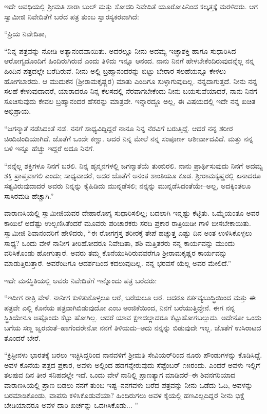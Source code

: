 ಇದೇ ಅವಧಿಯಲ್ಲಿ ಶ್ರೀಮತಿ ಸಾರಾ ಬುಲ್ ಮತ್ತು ಸೋದರಿ ನಿವೇದಿತೆ ಯೂರೋಪಿನಿಂದ ಕಲ್ಕತ್ತಕ್ಕೆ ಮರಳಿದರು. ಆಗ ಸ್ವಾಮೀಜಿ ನಿವೇದಿತೆಗೆ ಬರೆದ ಪತ್ರ ತುಂಬ ಸ್ವಾರಸ್ಯಕರವಾಗಿದೆ:

\noindent

“ಪ್ರಿಯ ನಿವೇದಿತಾ,

“ನಿನ್ನ ಪತ್ರವನ್ನು ನೋಡಿ ಅತ್ಯಾನಂದವಾಯಿತು. ಅದರಲ್ಲೂ ನೀನು ಅದಮ್ಯ ಇಚ್ಛಾಶಕ್ತಿ ಹಾಗೂ ಸುಧಾರಿಸಿದ ಆರೋಗ್ಯದೊಂದಿಗೆ ಹಿಂದಿರುಗಿರುವೆ ಎಂದು ತಿಳಿದು ಇನ್ನೂ ಆನಂದ. ನಾನು ನಿನಗೆ ಹೇಳಬೇಕೆಂದಿರುವುದನ್ನೆಲ್ಲ ನನ್ನ ಹಿಂದಿನ ಪತ್ರದಲ್ಲೇ ಬರೆದಿರುವೆ. ನೀನು ಅಲ್ಲಿ ಬ್ರಹ್ಮಾನಂದರನ್ನು ಬಿಟ್ಟು ಬೇರಾರ ಸಲಹೆಯನ್ನೂ ಕೇಳಲು ಹೋಗಬಾರದು. ಆ ಮುದುಕನ (ಶ್ರೀರಾಮಕೃಷ್ಣರ) ಮಾತು ಎಂದಿಗೂ ಸುಳ್ಳಾಗುವುದಿಲ್ಲ. ನನ್ನದಾಗುತ್ತದೆ. ನೀನು ನನ್ನ ಸಲಹೆ ಕೇಳುವುದಾದರೆ, ಯಾರಾದರೂ ನಿನ್ನ ಕೆಲಸದಲ್ಲಿ ನೆರವಾಗಬೇಕೆಂದು ನೀನು ಬಯಸುವೆಯಾದರೆ, ನಾನು ನಿನಗೆ ಸೂಚಿಸುವುದು ಕೇವಲ ಬ್ರಹ್ಮಾನಂದರ ಹೆಸರನ್ನು ಮಾತ್ರವೇ. ಇನ್ನಾರದ್ದೂ ಅಲ್ಲ, ಈ ವಿಷಯದಲ್ಲಿ ಇದೇ ನನ್ನ ಖಚಿತ ಅಭಿಪ್ರಾಯ.

“ಜಗನ್ಮಾತೆ ನಡೆಸಿದಂತೆ ನಡೆ. ನನಗೆ ಸಾಧ್ಯವಿದ್ದಿದ್ದರೆ ನಾನೂ ನಿನ್ನ ನೆರವಿಗೆ ಬರುತ್ತಿದ್ದೆ. ಆದರೆ ನನ್ನ ಶರೀರ ಚಿಂದಿಚಿಂದಿಯಾಗಿದೆ. ಜೊತೆಗೆ ಒಂದೇ ಕಣ್ಣು. ಆದರೆ ನಿನ್ನ ಮೇಲೆ ನನ್ನ ಸಂಪೂರ್ಣ ಆಶೀರ್ವಾದವಿದೆ. ಮತ್ತು ನನ್ನ ಬಳಿ ಇನ್ನೂ ಹೆಚ್ಚು ಇದ್ದರೆ ಅದೂ ನಿನಗೆ.

“ನನ್ನೆಲ್ಲ ಶಕ್ತಿಗಳೂ ನಿನಗೆ ಬರಲಿ. ನಿನ್ನ ಹೃನ್ಮನಗಳಲ್ಲಿ ಜಗನ್ಮಾತೆಯೆ ತುಂಬಿರಲಿ. ನಾನು ಪ್ರಾರ್ಥಿಸುವುದು ನಿನಗೆ ಅದಮ್ಯ ಶಕ್ತಿ ಪ್ರಾಪ್ತವಾಗಲಿ ಎಂದು; ಸಾಧ್ಯವಾದರೆ, ಅದರ ಜೊತೆಗೆ ಅನಂತ ಶಾಂತಿಯೂ ಕೂಡ. ಶ್ರೀರಾಮಕೃಷ್ಣರಲ್ಲಿ ಏನಾದರೂ ಸತ್ಯವಿರುವುದಾದರೆ ಅವರು ನಿನ್ನನ್ನು ಕೈಹಿಡಿದು ಮುನ್ನಡೆಸಲಿ; ನನ್ನನ್ನು ಮುನ್ನಡೆಸಿದಂತೆಯೇ–ಅಲ್ಲ, ಅದಕ್ಕಿಂತಲೂ ಸಾಸಿರಮಡಿ ಹೆಚ್ಚಾಗಿ.”

ವಾರಾಣಸಿಯಲ್ಲಿ ಸ್ವಾಮೀಜಿಯವರ ದೇಹಾರೋಗ್ಯ ಸುಧಾರಿಸಲಿಲ್ಲ; ಬದಲಾಗಿ ಇನ್ನಷ್ಟು ಕೆಟ್ಟಿತು. ಒಮ್ಮೆಯಂತೂ ಅವರ ಕಾಯಿಲೆ ಅದೆಷ್ಟು ಉಲ್ಬಣಿಸಿತೆಂದರೆ ಮೂವರು ಪರಿಚಾರಕರು ಸರದಿ ಪ್ರಕಾರ ರಾತ್ರಿಯಿಡೀ ಗಾಳಿ ಬೀಸಬೇಕಾಯಿತು. ಸ್ವಾಮೀಜಿ ಶಿವಾನಂದರಿಗೆ ಹೇಳಿದರು, “ಈ ರೋಗಗ್ರಸ್ತ ಶರೀರಕ್ಕೆ ತೇಪೆ ಹಚ್ಚುತ್ತ ಎಷ್ಟು ದಿನ ಅಂತ ಉಳಿಸಿಕೊಳ್ಳಲು ಸಾಧ್ಯ? ಒಂದು ವೇಳೆ ನಾನೀಗ ತೀರಿಹೋದರೂ ನಿವೇದಿತಾ, ಶಶಿ ಮತ್ತಿತರರು ನನ್ನ ಕಾರ್ಯವನ್ನು ಮುಂದು ವರಿಸಿಕೊಂಡು ಹೋಗುತ್ತಾರೆ. ಅವರು ತಮ್ಮ ಕೊನೆಯುಸಿರಿರುವವರೆಗೂ ಶ್ರೀರಾಮಕೃಷ್ಣರ ಕಾರ್ಯವನ್ನು ಮಾಡುತ್ತಿರುತ್ತಾರೆ. ಅವರೆಂದಿಗೂ ಆದರ್ಶದಿಂದ ಕದಲುವುದಿಲ್ಲ. ನನ್ನ ಭರವಸೆ ಯೆಲ್ಲ ಅವರ ಮೇಲಿದೆ.”

ಇದೇ ಮನಸ್ಥಿತಿಯಲ್ಲಿ ಅವರು ನಿವೇದಿತೆಗೆ ಇನ್ನೊಂದು ಪತ್ರ ಬರೆದರು:

“ಇದೀಗ ರಾತ್ರಿ ವೇಳೆ. ನಾನೀಗ ಕುಳಿತುಕೊಳ್ಳಲೂ ಆರೆ, ಬರೆಯಲೂ ಆರೆ. ಆದರೂ ಕರ್ತವ್ಯಬುದ್ಧಿಯಿಂದ ಮತ್ತು ಈ ಪತ್ರವೇ ಎಲ್ಲಿ ಕೊನೆಯ ಪತ್ರವಾಗಿಬಿಡುವುದೋ ಎಂಬ ಅಂಜಿಕೆಯಿಂದ, ನಿನಗೆ ಬರೆಯುತ್ತಿದ್ದೇನೆ. ಈಗ ನನ್ನ ಸ್ಥಿತಿಯೇನೂ ಅಷ್ಟೊಂದು ಕೆಟ್ಟು ಹೋಗಿಲ್ಲ. ಆದರೆ ಯಾವ ಕ್ಷಣದಲ್ಲಾದರೂ ಕೆಟ್ಟುಹೋಗಬಲ್ಲುದು. ಅದೇನೋ ಒಂದು ಬಗೆಯ ಸಣ್ಣ ಜ್ವರವಂತೆ–ಹಾಗೆಂದರೇನೋ ನನಗೆ ತಿಳಿಯದು–ಅದು ನನ್ನನ್ನು ಬಿಡುವುದೇ ಇಲ್ಲ. ಜೊತೆಗೆ ಉಸಿರಾಟದ ತೊಂದರೆ ಬೇರೆ.

“ಕ್ರಿಸ್ಟೀನಳು ಭಾರತಕ್ಕೆ ಬರಲು ಇಚ್ಛಿಸಿದ್ದರಿಂದ ನಾನವಳಿಗೆ ಶ್ರೀಮತಿ ಸೇವಿಯರ್​ರಿಂದ ನೂರು ಪೌಂಡುಗಳನ್ನು ಕೊಡಿಸಿದ್ದೆ. ಅವಳ ಕೊನೆಯ ಪತ್ರದ ಪ್ರಕಾರ, ಅವಳು ಅಲ್ಲಿಂದ ಹಡಗನ್ನೇರುವುದು ಸೆಪ್ಟೆಂಬರ್ ೧೫ರಂದು. ಎಂದರೆ ಅವಳು ಇಲ್ಲಿಗೆ ತಲಪುವ ದಿನ ತೀರ ಸನಿಹದಲ್ಲೇ ಇದೆ. ಒಂದು ವೇಳೆ ನಾನಿಲ್ಲಿ ಪ್ರಾಣತ್ಯಾಗ ಮಾಡಿದರೆ–ಈ ಶಿವನಗರಿಯಾದ ವಾರಾಣಸಿಯಲ್ಲಿ ಪ್ರಾಣ ಬಿಡಲು ನನಗೆ ತುಂಬ ಇಷ್ಟ–ನನಗವಳು ಬರೆದ ಪತ್ರವನ್ನು ನೀನು ಒಡೆದು ಓದಿ, ಅವಳನ್ನು ಬರಮಾಡಿಕೊಂಡು, ವಾಪಸು ಕಳಿಸಿಕೊಡುವೆಯಾ? ಹಿಂದಿರುಗಲು ಅವಳ ಕೈಯಲ್ಲಿ ಹಣವಿಲ್ಲದಿದ್ದರೆ ನೀನು ಭಿಕ್ಷೆ ಬೇಡಿಯಾದರೂ ಅವಳ ದಾರಿ ಖರ್ಚನ್ನು ಒದಗಿಸಿಕೊಡು... ”

